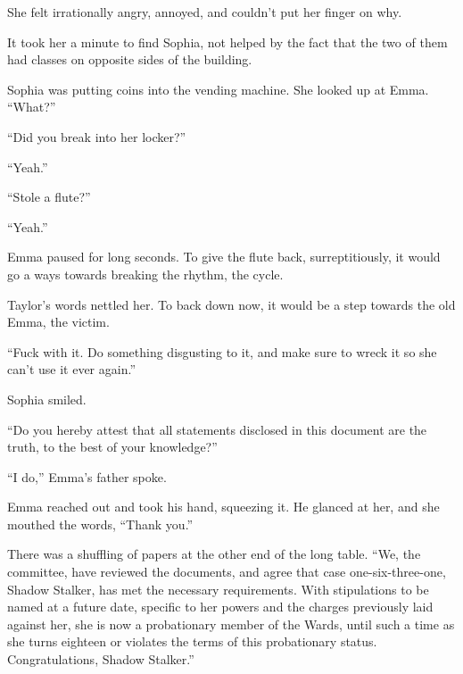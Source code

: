 She felt irrationally angry, annoyed, and couldn't put her finger on why.



It took her a minute to find Sophia, not helped by the fact that the two of them had classes on opposite sides of the building.



Sophia was putting coins into the vending machine.  She looked up at Emma.  ``What?''



``Did you break into her locker?''



``Yeah.''



``Stole a flute?''



``Yeah.''



Emma paused for long seconds.  To give the flute back, surreptitiously, it would go a ways towards breaking the rhythm, the cycle.



Taylor's words nettled her.  To back down now, it would be a step towards the old Emma, the victim.



``Fuck with it.  Do something disgusting to it, and make sure to wreck it so she can't use it ever again.''



Sophia smiled.



\blacksquare



``Do you hereby attest that all statements disclosed in this document are the truth, to the best of your knowledge?''



``I do,'' Emma's father spoke.



Emma reached out and took his hand, squeezing it.  He glanced at her, and she mouthed the words, ``Thank you.''



There was a shuffling of papers at the other end of the long table.  ``We, the committee, have reviewed the documents, and agree that case one-six-three-one, Shadow Stalker, has met the necessary requirements.  With stipulations to be named at a future date, specific to her powers and the charges previously laid against her, she is now a probationary member of the Wards, until such a time as she turns eighteen or violates the terms of this probationary status.  Congratulations, Shadow Stalker.''



